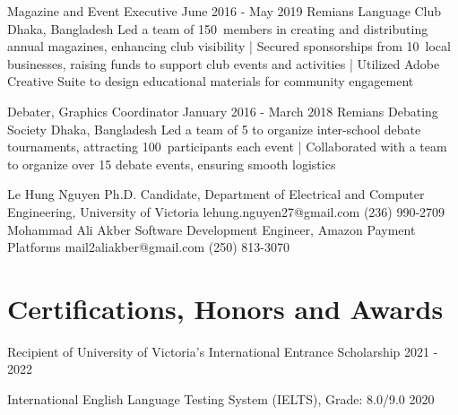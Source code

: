 \documentclass[a4paper,10pt]{article}
\begin{document}
\relevantexperience
{Magazine and Event Executive}
{June 2016 - May 2019}
{Remians Language Club}
{Dhaka, Bangladesh}
{Led a team of 150\plus\ members in creating and distributing annual magazines, enhancing club visibility
| Secured sponsorships from 10\plus\ local businesses, raising funds to support club events and activities 
| Utilized Adobe Creative Suite to design educational materials for community engagement
}

\relevantexperience
{Debater, Graphics Coordinator}
{January 2016 - March 2018}
{Remians Debating Society}
{Dhaka, Bangladesh}
{Led a team of 5 to organize inter-school debate tournaments, attracting 100\plus\ participants each event
| Collaborated with a team to organize over 15 debate events, ensuring smooth logistics 
}

\begin{references}
        {Le Hung Nguyen}
        {Ph.D. Candidate, Department of Electrical and}
        {Computer Engineering, University of Victoria}
        {lehung.nguyen27@gmail.com}
        {(236) 990-2709}
    \hfill
        {Mohammad Ali Akber}
        {Software Development Engineer,}
        {Amazon Payment Platforms}
        {mail2aliakber@gmail.com}
        {(250) 813-3070}
\end{references}

\section{Certifications, Honors and Awards}
\honorsawards
{Recipient of University of Victoria’s International Entrance Scholarship}
{2021 - 2022}

\honorsawards
{International English Language Testing System (IELTS), Grade: 8.0/9.0}
{2020}
\end{document}
